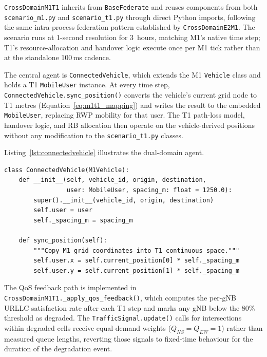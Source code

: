 \texttt{CrossDomainM1T1} inherits from \texttt{BaseFederate} and reuses components from both \texttt{scenario\_m1.py} and \texttt{scenario\_t1.py} through direct Python imports, following the same intra-process federation pattern established by \texttt{CrossDomainE2M1}. The scenario runs at 1-second resolution for 3~hours, matching M1's native time step; T1's resource-allocation and handover logic execute once per M1 tick rather than at the standalone 100\,ms cadence.

The central agent is \texttt{ConnectedVehicle}, which extends the M1 \texttt{Vehicle} class and holds a T1 \texttt{MobileUser} instance. At every time step, \texttt{ConnectedVehicle.sync\_position()} converts the vehicle's current grid node to T1 metres (Equation~\ref{eq:m1t1_mapping}) and writes the result to the embedded \texttt{MobileUser}, replacing RWP mobility for that user. The T1 path-loss model, handover logic, and RB allocation then operate on the vehicle-derived positions without any modification to the \texttt{scenario\_t1.py} classes.

Listing~\ref{lst:connectedvehicle} illustrates the dual-domain agent.

\begin{listing}[h]
\begin{verbatim}
class ConnectedVehicle(M1Vehicle):
    def __init__(self, vehicle_id, origin, destination,
                 user: MobileUser, spacing_m: float = 1250.0):
        super().__init__(vehicle_id, origin, destination)
        self.user = user
        self._spacing_m = spacing_m

    def sync_position(self):
        """Copy M1 grid coordinates into T1 continuous space."""
        self.user.x = self.current_position[0] * self._spacing_m
        self.user.y = self.current_position[1] * self._spacing_m
\end{verbatim}
\caption{\texttt{ConnectedVehicle} dual-domain agent (scenario\_m1t1.py)}
\label{lst:connectedvehicle}
\end{listing}

The QoS feedback path is implemented in \texttt{CrossDomainM1T1.\_apply\_qos\_feedback()}, which computes the per-gNB URLLC satisfaction rate after each T1 step and marks any gNB below the 80\% threshold as degraded. The \texttt{TrafficSignal.update()} calls for intersections within degraded cells receive equal-demand weights ($Q_{NS} = Q_{EW} = 1$) rather than measured queue lengths, reverting those signals to fixed-time behaviour for the duration of the degradation event.


